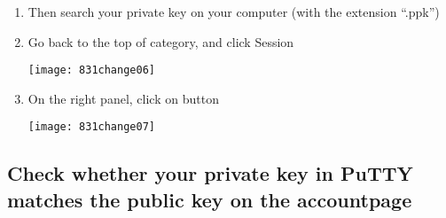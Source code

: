 \begin{enumerate}
    \item Then search your private key on your computer (with the extension ``.ppk'')

    \item Go back to the top of category, and click Session

    \begin{center}
    \texttt{[image: 831change06]}
    \end{center}

    \item On the right panel, click on  button

    \begin{center}
    \texttt{[image: 831change07]}
    \end{center}
\end{enumerate}

\subsection{Check whether your private key in PuTTY matches the public key on the accountpage}

